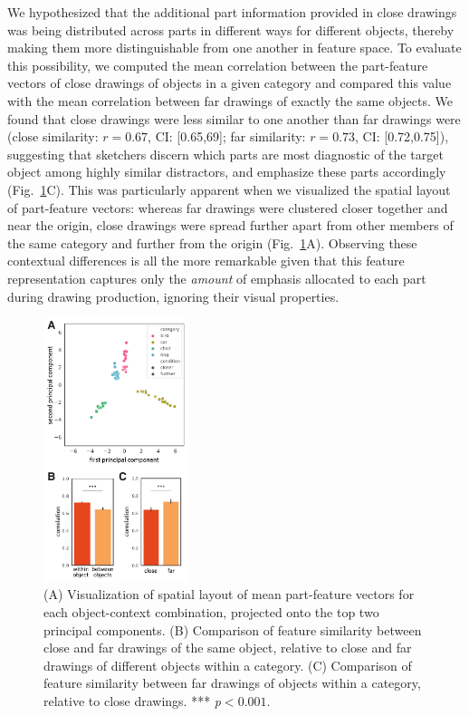 \documentclass[10pt,letterpaper]{article}
\begin{document}
We hypothesized that the additional part information provided in close drawings was being distributed across parts in different ways for different objects, thereby making them more distinguishable from one another in feature space.
To evaluate this possibility, we computed the mean correlation between the part-feature vectors of close drawings of objects in a given category and compared this value with the mean correlation between far drawings of exactly the same objects. 
We found that close drawings were less similar to one another than far drawings were (close similarity: $r = 0.67$, CI: [0.65,69]; far similarity: $r = 0.73$, CI: [0.72,0.75]), suggesting that sketchers discern which parts are most diagnostic of the target object among highly similar distractors, and emphasize these parts accordingly (Fig.~\ref{part_emphasis}C).
This was particularly apparent when we visualized the spatial layout of part-feature vectors: whereas far drawings were clustered closer together and near the origin, close drawings were spread further apart from other members of the same category and further from the origin (Fig.~\ref{part_emphasis}A).
Observing these contextual differences is all the more remarkable given that this feature representation captures only the \textit{amount} of emphasis allocated to each part during drawing production, ignoring their visual properties. 


\begin{figure}[ht]
\centering
\includegraphics[width=0.38\textwidth]{figures/7_part_emphasis.pdf}
\caption{(A) Visualization of spatial layout of mean part-feature vectors for each object-context combination, projected onto the top two principal components. (B) Comparison of feature similarity between close and far drawings of the same object, relative to close and far drawings of different objects within a category. (C) Comparison of feature similarity between far drawings of objects within a category, relative to close drawings. *** \textit{p}$<0.001.$}
\label{part_emphasis}
\end{figure}
\end{document}
